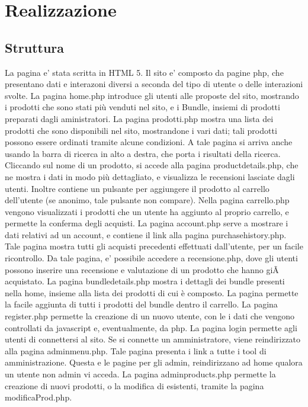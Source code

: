 \section{Realizzazione}
\subsection{Struttura}
La pagina e' stata scritta in HTML 5.\newline
Il sito e' composto da pagine php, che presentano dati e interazoni diversi a seconda del tipo di utente o delle interazioni svolte.
La pagina home.php introduce gli utenti alle proposte del sito, mostrando i prodotti che sono stati più venduti nel sito, e i Bundle, insiemi di prodotti preparati dagli aministratori.
La pagina prodotti.php mostra una lista dei prodotti che sono disponibili nel sito,
mostrandone i vari dati; tali prodotti possono essere ordinati tramite alcune condizioni. A tale pagina si arriva anche usando la barra di ricerca in alto a destra, che porta i risultati della ricerca.
Cliccando sul nome di un prodotto, si accede alla pagina productdetails.php, che ne mostra i dati in modo più dettagliato, e visualizza le recensioni lasciate dagli utenti. Inoltre contiene un pulsante per aggiungere il prodotto al carrello dell'utente (se anonimo, tale pulsante non compare).
Nella pagina carrello.php vengono visualizzati i prodotti che un utente ha aggiunto al proprio carrello, e permette la conferma degli acquisti.
La pagina account.php serve a mostrare i dati relativi ad un account, e contiene il link alla pagina purchasehistory.php.
Tale pagina mostra tutti gli acquisti precedenti effettuati dall'utente, per un facile ricontrollo.
Da tale pagina, e' possibile accedere a recensione.php, dove gli utenti possono inserire una recensione e valutazione di un prodotto che hanno giÃ  acquistato.
La pagina bundledetails.php mostra i dettagli dei bundle presenti nella home, insieme alla lista dei prodotti di cui è composto. La pagina permette la facile aggiunta di tutti i prodotti del bundle dentro il carrello.
La pagina register.php permette la creazione di un nuovo utente, con le i dati che vengono controllati da javascript e, eventualmente, da php.
La pagina login permette agli utenti di connettersi al sito. Se si connette un amministratore, viene reindirizzato alla pagina adminmenu.php.
Tale pagina presenta i link a tutte i tool di amministrazione. Questa e le pagine per gli admin, reindirizzano ad home qualora un utente non admin vi acceda.
La pagina adminproducts.php permette la creazione di nuovi prodotti, o la modifica di esistenti, tramite la pagina modificaProd.php.
